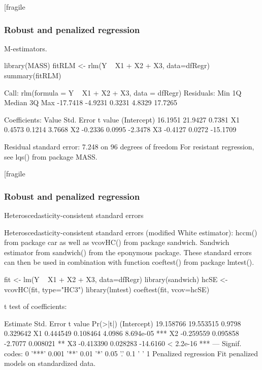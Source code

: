 \begin{frame}[fragile
\frametitle{Robust and penalized regression}
\large
M-estimators.

library(MASS)
fitRLM <- rlm(Y ~ X1 + X2 + X3, data=dfRegr)
summary(fitRLM)

Call: rlm(formula = Y ~ X1 + X2 + X3, data = dfRegr)
Residuals:
     Min       1Q   Median       3Q      Max 
-17.7418  -4.9231   0.3231   4.8329  17.7265 

Coefficients:
            Value    Std. Error t value 
(Intercept)  16.1951  21.9427     0.7381
X1            0.4573   0.1214     3.7668
X2           -0.2336   0.0995    -2.3478
X3           -0.4127   0.0272   -15.1709

Residual standard error: 7.248 on 96 degrees of freedom
For resistant regression, see lqs() from package MASS.
\end{frame}
\begin{frame}[fragile
\frametitle{Robust and penalized regression}
\large
Heteroscedasticity-consistent standard errors

Heteroscedasticity-consistent standard errors (modified White estimator): hccm() from package car as well as vcovHC() from package sandwich. Sandwich estimator from sandwich() from the eponymous package. These standard errors can then be used in combination with function coeftest() from package lmtest().

fit <- lm(Y ~ X1 + X2 + X3, data=dfRegr)
library(sandwich)
hcSE <- vcovHC(fit, type="HC3")
library(lmtest)
coeftest(fit, vcov=hcSE)

t test of coefficients:

             Estimate Std. Error  t value  Pr(>|t|)    
(Intercept) 19.158766  19.553515   0.9798  0.329642    
X1           0.444549   0.108464   4.0986 8.694e-05 ***
X2          -0.259559   0.095858  -2.7077  0.008021 ** 
X3          -0.413390   0.028283 -14.6160 < 2.2e-16 ***
---
Signif. codes:  0 '***' 0.001 '**' 0.01 '*' 0.05 '.' 0.1 ' ' 1
Penalized regression
Fit penalized models on standardized data.
\end{frame}

